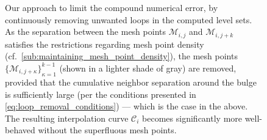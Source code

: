 \begin{figure}[htpb]
    \centering
    \resizebox{0.9\linewidth}{!}%
    {}
    \caption[Our approach to limit the compound numerical error, by
    continuously removing unwanted loops in the computed level sets]
    {Our approach to limit the compound numerical error, by continuously
        removing unwanted loops in the computed level sets. As the separation
        between the mesh points $\mathcal{M}_{i,j}$ and $\mathcal{M}_{i,j+k}$
        satisfies the restrictions regarding mesh point density
        (cf.\ \cref{sub:maintaining_mesh_point_density}), the mesh points
        ${\{\mathcal{M}_{i,j+\kappa}\}}_{\kappa=1}^{k-1}$ (shown in a lighter
        shade of gray) are removed, provided that the cumulative neighbor
        separation around the bulge is sufficiently large (per the conditions
        presented in \cref{eq:loop_removal_conditions}) --- which is the case
        in the above. The resulting interpolation curve $\mathcal{C}_{i}$
        becomes significantly more well-behaved without the superfluous mesh
        points.
    }
    \label{fig:loop_removal}
\end{figure}
